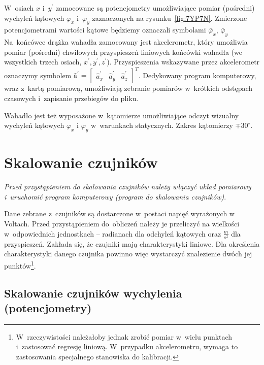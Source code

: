 \documentclass[paper=a4,DIV=12]{lpas}
\newcommand{\brm}[1]{\bm{\mathrm{#1}}}
\begin{document}
W~osiach $x$ i~$y^{\prime}$ zamocowane są potencjometry umożliwiające pomiar
(pośredni) wychyleń kątowych $\varphi_x$ i~$\varphi_y$ zaznaczonych na
rysunku~\ref{fig:7YP7N}. Zmierzone potencjometrami wartości kątowe będziemy
oznaczali symbolami $\bar{\varphi}_x$, $\bar{\varphi}_y$ Na~końcówce drążka
wahadła zamocowany jest akcelerometr, który umożliwia pomiar (pośredni)
chwilowych przyspieszeń liniowych końcówki wahadła (we wszystkich trzech
osiach, $x^{\prime},y^{\prime},z^{\prime}$). Przyspieszenia wskazywane przez
akcelerometr oznaczymy symbolem $\hat{\brm{a}}^{\prime} = \begin{bmatrix}
\hat{a}_x^{\prime} & \hat{a}_y^{\prime} & \hat{a}_z^{\prime} \end{bmatrix}^T$.
Dedykowany program komputerowy, wraz z~kartą pomiarową, umożliwiają zebranie
pomiarów w~krótkich odstępach czasowych i~zapisanie przebiegów do pliku.

Wahadło jest też wyposażone w~kątomierze umożliwiające odczyt wizualny wychyleń
kątowych $\varphi_x$ i $\varphi_y$ w~warunkach statycznych. Zakres kątomierzy
$\mp 30^{\circ}$.

\section{Skalowanie czujników}
\label{eq:NC01F}

{\em Przed przystąpieniem do skalowania czujników należy włączyć układ
pomiarowy i~uruchomić program komputerowy (program do skalowania czujników)}.

Dane zebrane z~czujników są dostarczone w~postaci napięć wyrażonych w Voltach.
Przed przy\-stą\-pie\-niem do~obliczeń należy je przeliczyć na wielkości
w~odpowiednich jednostkach -- radianach dla odchyleń kątowych oraz
$\tfrac{m}{s^2}$ dla przyspieszeń. Zakłada się, że czujniki mają
charakterystyki liniowe. Dla określenia charakterystyki danego czujnika
powinno więc wystarczyć znalezienie dwóch jej punktów\footnote{W~rzeczywistości
należałoby jednak zrobić pomiar w~wielu punktach i~zastosować regresję
liniową. W~przypadku akcelerometru, wymaga to zastosowania specjalnego
stanowiska do kalibracji.}.

\subsection{Skalowanie czujników wychylenia (potencjometry)}
\label{eq:460IS}
\end{document}
